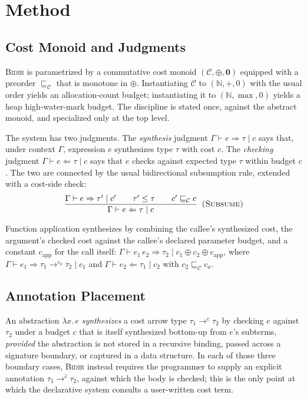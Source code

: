 \section{Method}
\label{sec:method}

\subsection{Cost Monoid and Judgments}

\textsc{Bidir} is parametrized by a commutative cost monoid
$(\mathcal{C}, \oplus, \mathbf{0})$ equipped with a preorder
$\sqsubseteq_{\mathcal{C}}$ that is monotone in $\oplus$. Instantiating
$\mathcal{C}$ to $(\mathbb{N}, +, 0)$ with the usual order yields an
allocation-count budget; instantiating it to $(\mathbb{N}, \max, 0)$
yields a heap high-water-mark budget. The discipline is stated once,
against the abstract monoid, and specialized only at the top level.

The system has two judgments. The \emph{synthesis} judgment
$\Gamma \vdash e \Rightarrow \tau \mid c$ says that, under context
$\Gamma$, expression $e$ synthesizes type $\tau$ with cost $c$. The
\emph{checking} judgment $\Gamma \vdash e \Leftarrow \tau \mid c$ says
that $e$ checks against expected type $\tau$ within budget $c$. The two
are connected by the usual bidirectional subsumption rule, extended with
a cost-side check:
\begin{equation}
  \label{eq:subsumption}
  \frac{
    \Gamma \vdash e \Rightarrow \tau' \mid c' \qquad
    \tau' \le \tau \qquad
    c' \sqsubseteq_{\mathcal{C}} c
  }{
    \Gamma \vdash e \Leftarrow \tau \mid c
  }
  \;\;\textsc{(Subsume)}
\end{equation}

Function application synthesizes by combining the callee's synthesized
cost, the argument's checked cost against the callee's declared
parameter budget, and a constant $c_{\mathrm{app}}$ for the call itself:
$\Gamma \vdash e_1\,e_2 \Rightarrow \tau_2 \mid c_1 \oplus c_2 \oplus
c_{\mathrm{app}}$, where $\Gamma \vdash e_1 \Rightarrow \tau_1 \to^{c_a}
\tau_2 \mid c_1$ and $\Gamma \vdash e_2 \Leftarrow \tau_1 \mid c_2$ with
$c_2 \sqsubseteq_{\mathcal{C}} c_a$.

\subsection{Annotation Placement}

An abstraction $\lambda x.\,e$ \emph{synthesizes} a cost arrow type
$\tau_1 \to^{c} \tau_2$ by checking $e$ against $\tau_2$ under a
budget $c$ that is itself synthesized bottom-up from $e$'s subterms,
\emph{provided} the abstraction is not stored in a recursive binding,
passed across a signature boundary, or captured in a data structure. In
each of those three boundary cases, \textsc{Bidir} instead requires the
programmer to supply an explicit annotation $\tau_1 \to^{\hat{c}} \tau_2$,
against which the body is checked; this is the only point at which the
declarative system consults a user-written cost term.

